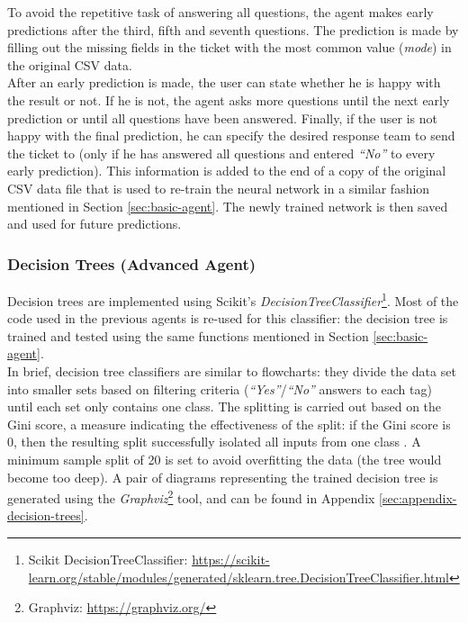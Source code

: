 \documentclass[letterpaper,12pt]{article}
\begin{document}
To avoid the repetitive task of answering all questions, the agent makes early predictions after the third, fifth and seventh questions. The prediction is made by filling out the missing fields in the ticket with the most common value (\textit{mode}) in the original CSV data.\\

After an early prediction is made, the user can state whether he is happy with the result or not. If he is not, the agent asks more questions until the next early prediction or until all questions have been answered. Finally, if the user is not happy with the final prediction, he can specify the desired response team to send the ticket to (only if he has answered all questions and entered \textit{``No''} to every early prediction). This information is added to the end of a copy of the original CSV data file that is used to re-train the neural network in a similar fashion mentioned in Section \ref{sec:basic-agent}. The newly trained network is then saved and used for future predictions.


\subsubsection{Decision Trees (Advanced Agent)}

Decision trees are implemented using Scikit's \textit{DecisionTreeClassifier}\footnote{Scikit DecisionTreeClassifier: \url{https://scikit-learn.org/stable/modules/generated/sklearn.tree.DecisionTreeClassifier.html}}. Most of the code used in the previous agents is re-used for this classifier: the decision tree is trained and tested using the same functions mentioned in Section \ref{sec:basic-agent}.\\

In brief, decision tree classifiers are similar to flowcharts: they divide the data set into smaller sets based on filtering criteria (\textit{``Yes''}/\textit{``No''} answers to each tag) until each set only contains one class. The splitting is carried out based on the Gini score, a measure indicating the effectiveness of the split: if the Gini score is 0, then the resulting split successfully isolated all inputs from one class \cite{dt}. A minimum sample split of 20 is set to avoid overfitting the data (the tree would become too deep). A pair of diagrams representing the trained decision tree is generated using the \textit{Graphviz}\footnote{Graphviz: \url{https://graphviz.org/}} tool, and can be found in Appendix \ref{sec:appendix-decision-trees}.
\end{document}
